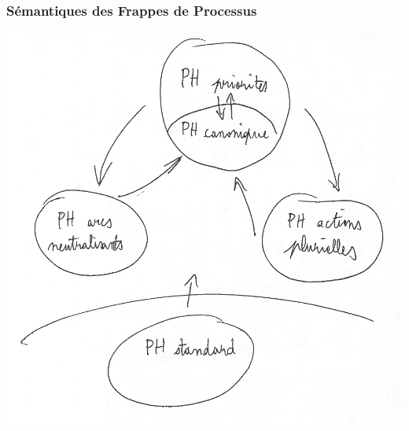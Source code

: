 
\begin{frame}[c]
  \frametitle{Sémantiques des Frappes de Processus}

\centering
\includegraphics[height=.9\textheight]{figs/PH1.png}

\end{frame}
